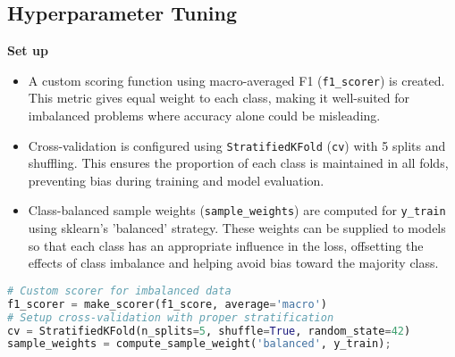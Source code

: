 \documentclass[twoside,final]{hcmut-report}
\begin{document}
\subsection{Hyperparameter Tuning}
\textbf{Set up}
\begin{itemize}[itemsep=0pt, topsep=0pt, label=---]
  \item A custom scoring function using macro-averaged F1 (\texttt{f1\_scorer}) is created. This metric gives equal weight to each class, making it well-suited for imbalanced problems where accuracy alone could be misleading.
  \item Cross-validation is configured using \texttt{StratifiedKFold} (\texttt{cv}) with 5 splits and shuffling. This ensures the proportion of each class is maintained in all folds, preventing bias during training and model evaluation.
  \item Class-balanced sample weights (\texttt{sample\_weights}) are computed for \texttt{y\_train} using sklearn's 'balanced' strategy. These weights can be supplied to models so that each class has an appropriate influence in the loss, offsetting the effects of class imbalance and helping avoid bias toward the majority class.
\end{itemize}
\begin{lstlisting}[language=python]
# Custom scorer for imbalanced data
f1_scorer = make_scorer(f1_score, average='macro')
# Setup cross-validation with proper stratification
cv = StratifiedKFold(n_splits=5, shuffle=True, random_state=42)
sample_weights = compute_sample_weight('balanced', y_train);
\end{lstlisting}
\end{document}
